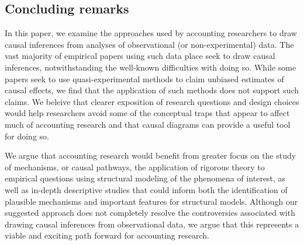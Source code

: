 \documentclass[11pt,reqno,titlepage]{amsart}
\begin{document}
\begin{doublespace}

%
%
%

\section{Concluding remarks} \label{sec:conclude}
In this paper, we examine the approaches used by accounting researchers to draw causal inferences from analyses of observational (or non-experimental) data. 
The vast majority of empirical papers using such data place seek to draw causal inferences, notwithstanding the well-known difficulties with doing so.
While some papers seek to use quasi-experimental methods to claim unbiased estimates of causal effects, we find that the application of such methods does not support such claims.
We beleive that clearer exposition of research questions and design choices would help researchers avoid some of the conceptual traps that appear to affect much of accounting research and that causal diagrams can provide a useful tool for doing so.

We argue that  accounting research would benefit from greater focus on the study of  mechanisms, or causal pathways, the application of rigorous theory to empirical questions using  structural modeling of the phenomena of interest, as well as in-depth descriptive studies that could inform both the identification of plausible mechanisms and important features for structural models.
Although our suggested approach does not completely resolve the controversies associated with drawing causal inferences from observational data, we argue that this represents a viable and exciting path forward for accounting research.

\end{doublespace}
\end{document}
